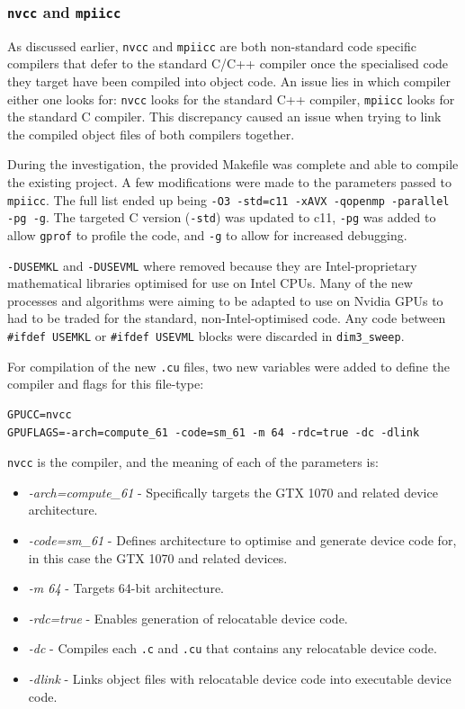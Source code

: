 \documentclass[conference]{IEEEtran}
\begin{document}
\subsubsection{\texttt{nvcc} and \texttt{mpiicc}}

As discussed earlier, \texttt{nvcc} and \texttt{mpiicc} are both non-standard code specific compilers that defer to the standard C/C++ compiler once the specialised code they target have been compiled into object code. An issue lies in which compiler either one looks for: \texttt{nvcc} looks for the standard C++ compiler, \texttt{mpiicc} looks for the standard C compiler. This discrepancy caused an issue when trying to link the compiled object files of both compilers together.

During the investigation, the provided Makefile was complete and able to compile the existing project. A few modifications were made to the parameters passed to \texttt{mpiicc}. The full list ended up being \texttt{-O3 -std=c11 -xAVX -qopenmp -parallel -pg -g}. The targeted C version (\texttt{-std}) was updated to c11, \texttt{-pg} was added to allow \texttt{gprof} to profile the code, and \texttt{-g} to allow for increased debugging.

\texttt{-DUSEMKL} and \texttt{-DUSEVML} where removed because they are Intel-proprietary mathematical libraries optimised for use on Intel CPUs. Many of the new processes and algorithms were aiming to be adapted to use on Nvidia GPUs to had to be traded for the standard, non-Intel-optimised code. Any code between \texttt{\#ifdef USEMKL} or \texttt{\#ifdef USEVML} blocks were discarded in \texttt{dim3\_sweep}.

For compilation of the new \texttt{.cu} files, two new variables were added to define the compiler and flags for this file-type:

\begin{lstlisting}[breaklines]
GPUCC=nvcc
GPUFLAGS=-arch=compute_61 -code=sm_61 -m 64 -rdc=true -dc -dlink
\end{lstlisting}

\texttt{nvcc} is the compiler, and the meaning of each of the parameters is:

\begin{itemize}
    \item \textit{-arch=compute\_61} - Specifically targets the GTX 1070 and related device architecture.
    \item \textit{-code=sm\_61} - Defines architecture to optimise and generate device code for, in this case the GTX 1070 and related devices. 
    \item \textit{-m 64} - Targets 64-bit architecture.
    \item \textit{-rdc=true} - Enables generation of relocatable device code.
    \item \textit{-dc} - Compiles each \texttt{.c} and \texttt{.cu} that contains any relocatable device code.
    \item \textit{-dlink} - Links object files with relocatable device code into executable device code.
\end{itemize}
\end{document}
